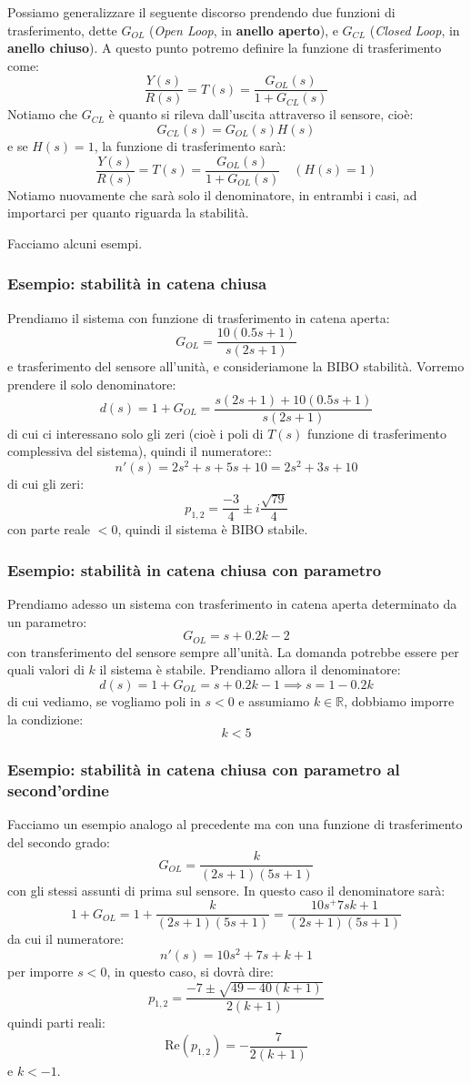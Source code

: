 \documentclass[a4paper,11pt]{article}
\begin{document}
Possiamo generalizzare il seguente discorso prendendo due funzioni di trasferimento, dette $G_{OL}$ (\textit{Open Loop}, in \textbf{anello aperto}), e $G_{CL}$ (\textit{Closed Loop}, in \textbf{anello chiuso}).
A questo punto potremo definire la funzione di trasferimento come:
$$
\frac{Y(s)}{R(s)} = T(s) = \frac{G_{OL}(s)}{1 + G_{CL}(s)}
$$
Notiamo che $G_{CL}$ è quanto si rileva dall'uscita attraverso il sensore, cioè:
$$
G_{CL}(s) = G_{OL}(s) H(s)
$$
e se $H(s) = 1$, la funzione di trasferimento sarà:
$$
\frac{Y(s)}{R(s)} = T(s) = \frac{G_{OL}(s)}{1 + G_{OL}(s)} \quad (H(s) = 1)
$$
Notiamo nuovamente che sarà solo il denominatore, in entrambi i casi, ad importarci per quanto riguarda la stabilità.

Facciamo alcuni esempi.

\subsubsection{Esempio: stabilità in catena chiusa}
Prendiamo il sistema con funzione di trasferimento in catena aperta:
$$
G_{OL} = \frac{10(0.5s + 1)}{s(2s + 1)}
$$
e trasferimento del sensore all'unità, e consideriamone la BIBO stabilità.
Vorremo prendere il solo denominatore:
$$
d(s) = 1 + G_{OL} = \frac{s(2s + 1) + 10(0.5s + 1)}{s(2s + 1)}
$$
di cui ci interessano solo gli zeri (cioè i poli di $T(s)$ funzione di trasferimento complessiva del sistema), quindi il numeratore::
$$
n'(s) = 2s^2 + s + 5s +10 = 2s^2 + 3s + 10
$$
di cui gli zeri:
$$
p_{1, 2} = \frac{-3}{4} \pm i \frac{\sqrt{79}}{4}
$$
con parte reale $< 0$, quindi il sistema è BIBO stabile.

\subsubsection{Esempio: stabilità in catena chiusa con parametro}
Prendiamo adesso un sistema con trasferimento in catena aperta determinato da un parametro:
$$
G_{OL} = s + 0.2 k - 2
$$
con transferimento del sensore sempre all'unità.
La domanda potrebbe essere per quali valori di $k$ il sistema è stabile.
Prendiamo allora il denominatore:
$$
d(s) = 1 + G_{OL} = s + 0.2 k - 1 \implies s = 1 - 0.2k
$$
di cui vediamo, se vogliamo poli in $s < 0$ e assumiamo $k \in \mathbb{R}$, dobbiamo imporre la condizione:
$$
k < 5
$$

\subsubsection{Esempio: stabilità in catena chiusa con parametro al second'ordine}
Facciamo un esempio analogo al precedente ma con una funzione di trasferimento del secondo grado:
$$
G_{OL} = \frac{k}{(2s + 1)(5s + 1)}
$$
con gli stessi assunti di prima sul sensore.
In questo caso il denominatore sarà:
$$
1 + G_{OL} = 1 + \frac{k}{(2s + 1)(5s + 1)} = \frac{10s^ + 7s  k + 1}{(2s + 1)(5s + 1)}
$$
da cui il numeratore:
$$
n'(s) = 10s^2 + 7s + k + 1
$$
per imporre $s < 0$, in questo caso, si dovrà dire:
$$
p_{1, 2} = \frac{-7 \pm \sqrt{49 - 40 (k + 1)}}{2(k + 1)}
$$
quindi parti reali:
$$
\mathrm{Re}(p_{1,2}) = -\frac{7}{2(k + 1)}
$$
e $k < -1$.
\end{document}
